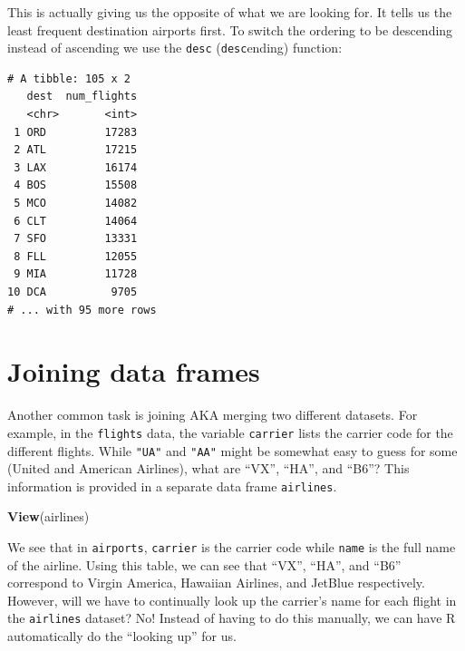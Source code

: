\documentclass[12pt,]{krantz}
\makeatletter
\newenvironment{Shaded}{\begin{snugshade}}{\end{snugshade}}
\newcommand{\KeywordTok}[1]{\textcolor[rgb]{0.27,0.27,0.27}{\textbf{#1}}}
\newcommand{\StringTok}[1]{\textcolor[rgb]{0.5,0.5,0.5}{#1}}
\newcommand{\OperatorTok}[1]{\textcolor[rgb]{0.43,0.43,0.43}{\textbf{#1}}}
\newcommand{\NormalTok}[1]{#1}
\newenvironment{kframe}{%
\medskip{}
\setlength{\fboxsep}{.8em}
 \def\at@end@of@kframe{}%
 \ifinner\ifhmode%
  \def\at@end@of@kframe{\end{minipage}}%
  \begin{minipage}{\columnwidth}%
 \fi\fi%
 \def\FrameCommand##1{\hskip\@totalleftmargin \hskip-\fboxsep
 \colorbox{shadecolor}{##1}\hskip-\fboxsep
     \hskip-\linewidth \hskip-\@totalleftmargin \hskip\columnwidth}%
 \MakeFramed {\advance\hsize-\width
   \@totalleftmargin\z@ \linewidth\hsize
   \@setminipage}}%
 {\par\unskip\endMakeFramed%
 \at@end@of@kframe}
\renewenvironment{Shaded}{\begin{kframe}}{\end{kframe}}
\makeatother
\begin{document}
This is actually giving us the opposite of what we are looking for. It
tells us the least frequent destination airports first. To switch the
ordering to be descending instead of ascending we use the \texttt{desc}
(\texttt{desc}ending) function:

\begin{Shaded}
\end{Shaded}

\begin{verbatim}
# A tibble: 105 x 2
   dest  num_flights
   <chr>       <int>
 1 ORD         17283
 2 ATL         17215
 3 LAX         16174
 4 BOS         15508
 5 MCO         14082
 6 CLT         14064
 7 SFO         13331
 8 FLL         12055
 9 MIA         11728
10 DCA          9705
# ... with 95 more rows
\end{verbatim}

\section{Joining data frames}\label{joins}

Another common task is joining AKA merging two different datasets. For
example, in the \texttt{flights} data, the variable \texttt{carrier}
lists the carrier code for the different flights. While \texttt{"UA"}
and \texttt{"AA"} might be somewhat easy to guess for some (United and
American Airlines), what are ``VX'', ``HA'', and ``B6''? This
information is provided in a separate data frame \texttt{airlines}.

\begin{Shaded}
\begin{Highlighting}[]
\KeywordTok{View}\NormalTok{(airlines)}
\end{Highlighting}
\end{Shaded}

We see that in \texttt{airports}, \texttt{carrier} is the carrier code
while \texttt{name} is the full name of the airline. Using this table,
we can see that ``VX'', ``HA'', and ``B6'' correspond to Virgin America,
Hawaiian Airlines, and JetBlue respectively. However, will we have to
continually look up the carrier's name for each flight in the
\texttt{airlines} dataset? No! Instead of having to do this manually, we
can have R automatically do the ``looking up'' for us.
\end{document}
